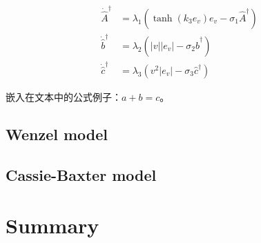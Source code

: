 \begin{subequations}\label{eq:02:02}
  \begin{align}
  \dot{\hat{A}}^\dag&=\lambda_1\left(\tanh(k_3e_v)e_v-\sigma_1\hat{A}^\dag\right)\label{eq:02:02a}\\
  \dot{\hat{b}}^\dag&=\lambda_2\left(|v||e_v|-\sigma_2\hat{b}^\dag\right)\label{eq:02:02b}\\
  \dot{\hat{c}}^\dag&=\lambda_3\left(v^2|e_v|-\sigma_3\hat{c}^\dag\right)\label{eq:02:02c}
  \end{align}
  \end{subequations}

嵌入在文本中的公式例子：$a + b = c$。

\subsection{Wenzel model}

\subsection{Cassie-Baxter model}

\section{Summary}




%


